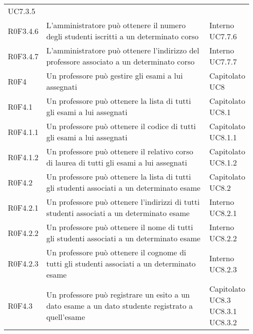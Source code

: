 \documentclass[AnalisiDeiRequisiti.tex]{subfiles}
\begin{document}
\begin{longtable}[H]{p{2cm}p{5.2cm}p{5cm}}
{		UC7.3.5
	} \\
	R0F3.4.6 & L'amministratore può ottenere il numero degli studenti iscritti a un determinato corso  & \makecell[tl]{
		Interno	 \\ 
		UC7.7.6
	} \\
	R0F3.4.7 & L'amministratore può ottenere l'indirizzo del professore associato a un determinato corso  & \makecell[tl]{
		Interno	 \\ 
		UC7.7.7
	} \\
	R0F4 & Un professore può gestire gli esami a lui assegnati & \makecell[tl]{
		Capitolato \\ 
		UC8
	} \\
	R0F4.1 & Un professore può ottenere la lista di tutti gli esami a lui assegnati & \makecell[tl]{
		Capitolato \\ 
		UC8.1
	} \\
	R0F4.1.1 & Un professore può ottenere il codice di tutti gli esami a lui assegnati & \makecell[tl]{
		Capitolato \\ 
		UC8.1.1
	} \\
	R0F4.1.2 & Un professore può ottenere il relativo corso di laurea di tutti gli esami a lui assegnati& \makecell[tl]{
		Capitolato \\ 
		UC8.1.2
	} \\
	R0F4.2 & Un professore può ottenere la lista di tutti gli studenti associati a un determinato esame & \makecell[tl]{
		Capitolato  \\ 
		UC8.2
	} \\
	R0F4.2.1 & Un professore può ottenere l'indirizzi di tutti studenti associati a un determinato esame & \makecell[tl]{
		Interno  \\ 
		UC8.2.1
	} \\
	R0F4.2.2 & Un professore può ottenere il nome di tutti gli studenti associati a un determinato esame & \makecell[tl]{
		Interno  \\ 
		UC8.2.2
	} \\
	R0F4.2.3 & Un professore può ottenere il cognome di tutti gli studenti associati a un determinato esame & \makecell[tl]{
		Interno  \\ 
		UC8.2.3
	} \\
	R0F4.3 & Un professore può registrare un esito a un dato esame a un dato studente registrato a quell'esame & \makecell[tl]{
		Capitolato \\ 
		UC8.3 \\
		UC8.3.1 \\
		UC8.3.2 \\
}
\end{longtable}
\end{document}
